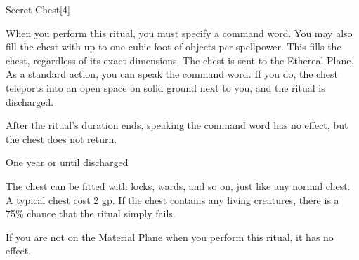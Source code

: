 \begin{spellsection}{Secret Chest}[4]
    \begin{spellheader}
    \end{spellheader}
    \begin{spellcontent}
        \begin{spelltargetinginfo}
        \end{spelltargetinginfo}
        \begin{spelleffects}
            \spellspecial When you perform this ritual, you must specify a command word. You may also fill the chest with up to one cubic foot of objects per spellpower. This fills the chest, regardless of its exact dimensions.
            \spelleffect The chest is sent to the Ethereal Plane. As a standard action, you can speak the command word. If you do, the chest teleports into an open space on solid ground next to you, and the ritual is discharged.

            After the ritual's duration ends, speaking the command word has no effect, but the chest does not return.

            \spelldur One year or until discharged
        \end{spelleffects}
    \end{spellcontent}
    \begin{spellfooter}
        \spellnotes The chest can be fitted with locks, wards, and so on, just like any normal chest. A typical chest cost 2 gp. If the chest contains any living creatures, there is a 75\% chance that the ritual simply fails.

        If you are not on the Material Plane when you perform this ritual, it has no effect.
    \end{spellfooter}
\end{spellsection}

